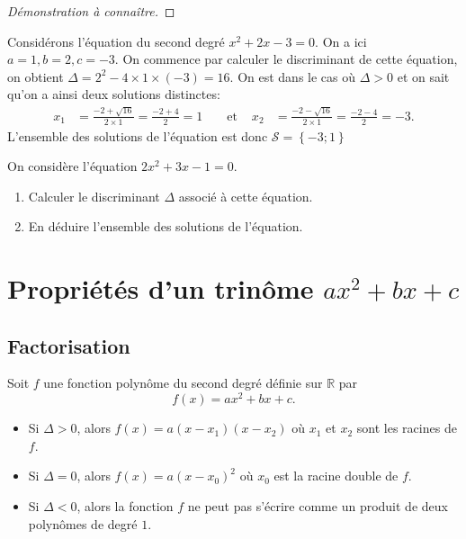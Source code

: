 \documentclass[11pt]{article}
\begin{document}
\begin{proof}[Démonstration à connaître]
\end{proof}

\begin{exemple}
  Considérons l'équation du second degré $x^2+2x-3 = 0$.
  On a ici $a=1, b=2, c=-3$. On commence par calculer le discriminant de cette
  équation, on obtient $\Delta = 2^2 - 4\times 1\times(-3) = 16$.
  On est dans le cas où $\Delta>0$ et on sait qu'on a ainsi deux solutions
  distinctes:
  \begin{align*}
    x_1 &= \frac{-2+\sqrt{16}}{2\times1} = \frac{-2+4}{2} = 1 &
    &\text{ et } &
    x_2 &= \frac{-2-\sqrt{16}}{2\times1} = \frac{-2-4}{2} = -3.
  \end{align*}
 L'ensemble des solutions de l'équation est donc $\mathscr S =\left\{ -3; 1
 \right\}$
\end{exemple}

\begin{app}
  On considère l'équation $2x^2+3x-1=0$.
  \begin{enumerate}
    \item Calculer le discriminant $\Delta$ associé à cette équation.
    \item En déduire l'ensemble des solutions de l'équation.
  \end{enumerate}
\end{app}

\section{Propriétés d'un trinôme $ax^2+bx+c$}
\subsection{Factorisation}

\begin{propadm}
  Soit $f$ une fonction polynôme du second degré définie sur $\mathbb{R}$ par
  \[
    f(x) = ax^2+bx+c.
  \]
  \begin{itemize}
    \item Si $\Delta>0$, alors $f(x)=a(x-x_1)(x-x_2)$ où $x_1$ et $x_2$ sont les
      racines de $f$.
    \item Si $\Delta=0$, alors $f(x)=a(x-x_0)^2$ où $x_0$ est la racine double de
      $f$.
    \item Si $\Delta<0$, alors la fonction $f$ ne peut pas s'écrire comme un
      produit de deux polynômes de degré $1$.
  \end{itemize}
\end{propadm}
\end{document}
